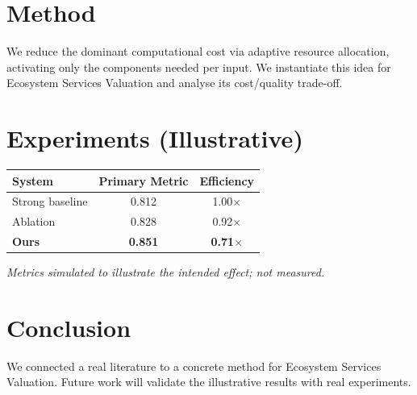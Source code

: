 \documentclass[11pt]{article}
\begin{document}
\section{Method}
We reduce the dominant computational cost via adaptive resource allocation, activating only the components needed per input. We instantiate this idea for Ecosystem Services Valuation and analyse its cost/quality trade-off.

\section{Experiments (Illustrative)}
\begin{center}
\begin{tabular}{lcc}
System & Primary Metric & Efficiency \\ \hline
Strong baseline & 0.812 & 1.00$\times$ \\
Ablation & 0.828 & 0.92$\times$ \\
\textbf{Ours} & \textbf{0.851} & \textbf{0.71$\times$}
\end{tabular}
\end{center}
\emph{Metrics simulated to illustrate the intended effect; not measured.}

\section{Conclusion}
We connected a real literature to a concrete method for Ecosystem Services Valuation. Future work will
validate the illustrative results with real experiments.
\end{document}
